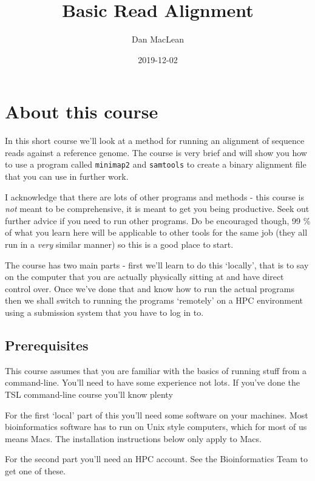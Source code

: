 \documentclass[]{book}
\title{Basic Read Alignment}
\author{Dan MacLean}
\date{2019-12-02}
\begin{document}
\maketitle

{
\setcounter{tocdepth}{1}
\tableofcontents
}
\hypertarget{about-this-course}{%
\chapter{About this course}\label{about-this-course}}

In this short course we'll look at a method for running an alignment of sequence reads against a reference genome. The course is very brief and will show you how to use a program called \texttt{minimap2} and \texttt{samtools} to create a binary alignment file that you can use in further work.

I acknowledge that there are lots of other programs and methods - this course is \emph{not} meant to be comprehensive, it is meant to get you being productive. Seek out further advice if you need to run other programs. Do be encouraged though, 99 \% of what you learn here will be applicable to other tools for the same job (they all run in a \emph{very} similar manner) so this is a good place to start.

The course has two main parts - first we'll learn to do this `locally', that is to say on the computer that you are actually physically sitting at and have direct control over. Once we've done that and know how to run the actual programs then we shall switch to running the programs `remotely' on a HPC environment using a submission system that you have to log in to.

\hypertarget{prerequisites}{%
\section{Prerequisites}\label{prerequisites}}

This course assumes that you are familiar with the basics of running stuff from a command-line. You'll need to have some experience not lots. If you've done the TSL command-line course you'll know plenty

For the first `local' part of this you'll need some software on your machines. Most bioinformatics software has to run on Unix style computers, which for most of us means Macs. The installation instructions below only apply to Macs.

For the second part you'll need an HPC account. See the Bioinformatics Team to get one of these.
\end{document}
